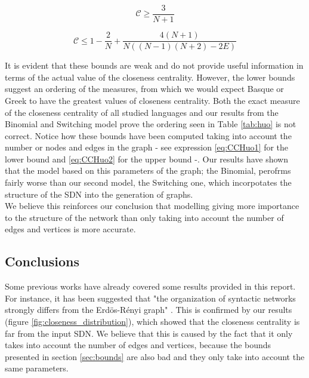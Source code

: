 \begin{minipage}{0.49\textwidth}
    \begin{equation}\label{eq:CCHuo1}
    \mathcal{C} \geq \dfrac{3}{N+1}
\end{equation}
\end{minipage}
\begin{minipage}{0.49\textwidth}
    \begin{equation}\label{eq:CCHuo2}
    \mathcal{C} \leq 1-\dfrac{2}{N}+\dfrac{4(N+1)}{N\left((N-1)(N+2)-2E\right)}
\end{equation}
\end{minipage}



It is evident that these bounds are weak and do not provide useful information in terms of the actual value of the closeness centrality. However, the lower bounds suggest an ordering of the measures, from which we would expect Basque or Greek to have the greatest values of closeness centrality. Both the exact measure of the closeness centrality of all studied languages and our results from the Binomial and Switching model prove the ordering seen in Table \ref{tab:huo} is not correct. Notice how these bounds have been computed taking into account the number or nodes and edges in the graph - see expression \eqref{eq:CCHuo1} for the lower bound and \eqref{eq:CCHuo2} for the upper bound -. Our results have shown that the model based on this parameters of the graph; the Binomial, perofrms fairly worse than our second model, the Switching one, which incorpotates the structure of the SDN into the generation of graphs.\\
We believe this reinforces our conclusion that modelling giving more importance to the structure of the network than only taking into account the number of edges and vertices is more accurate.

\subsection{Conclusions}
Some previous works have already covered some results provided in this report. For instance, it has been suggested that "the organization of syntactic networks strongly differs from the Erdös-Rényi graph" \cite{i2004patterns}. This is confirmed by our results (figure \ref{fig:closeness_distribution}), which showed that the closeness centrality is far from the input SDN. We believe that this is caused by the fact that it only takes into account the number of edges and vertices, because the bounds presented in section \ref{sec:bounds} are also bad and they only take into account the same parameters.

